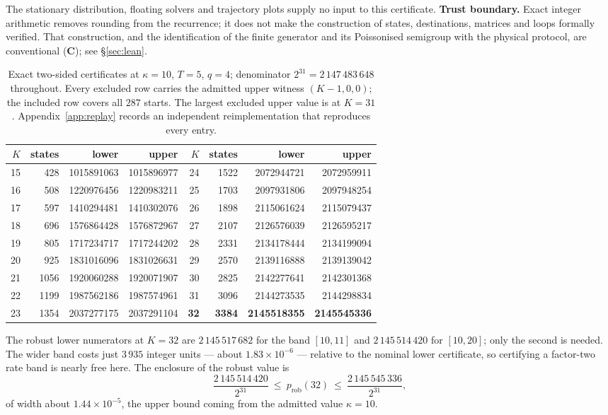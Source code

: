 \documentclass[11pt]{article}
\theoremstyle{plain}
\theoremstyle{definition}
\theoremstyle{remark}
\begin{document}
The stationary distribution, floating solvers and trajectory plots supply no
input to this certificate. \textbf{Trust boundary.} Exact integer arithmetic
removes rounding from the recurrence; it does not make the construction of
states, destinations, matrices and loops formally verified. That construction,
and the identification of the finite generator and its Poissonised semigroup
with the physical protocol, are conventional (\textbf{C}); see
\S\ref{sec:lean}.

\begin{table}[t]
\centering\small
\caption{Exact two-sided certificates at $\kappa=10$, $T=5$, $q=4$;
denominator $2^{31}=2\,147\,483\,648$ throughout. Every excluded row carries
the admitted upper witness $(K-1,0,0)$; the included row covers all $287$
starts. The largest excluded upper value is at $K=31$. Appendix~\ref{app:replay}
records an independent reimplementation that reproduces every entry.}
\label{tab:nominal}
\begin{tabular}{rrrr@{\qquad}rrrr}
\toprule
$K$ & states & lower & upper & $K$ & states & lower & upper\\
\midrule
15 & 428  & 1015891063 & 1015896977 & 24 & 1522 & 2072944721 & 2072959911\\
16 & 508  & 1220976456 & 1220983211 & 25 & 1703 & 2097931806 & 2097948254\\
17 & 597  & 1410294481 & 1410302076 & 26 & 1898 & 2115061624 & 2115079437\\
18 & 696  & 1576864428 & 1576872967 & 27 & 2107 & 2126576039 & 2126595217\\
19 & 805  & 1717234717 & 1717244202 & 28 & 2331 & 2134178444 & 2134199094\\
20 & 925  & 1831016096 & 1831026631 & 29 & 2570 & 2139116888 & 2139139042\\
21 & 1056 & 1920060288 & 1920071907 & 30 & 2825 & 2142277641 & 2142301368\\
22 & 1199 & 1987562186 & 1987574961 & 31 & 3096 & 2144273535 & 2144298834\\
23 & 1354 & 2037277175 & 2037291104 & \textbf{32} & \textbf{3384}
                                    & \textbf{2145518355} & \textbf{2145545336}\\
\bottomrule
\end{tabular}
\end{table}

The robust lower numerators at $K=32$ are $2\,145\,517\,682$ for the band
$[10,11]$ and $2\,145\,514\,420$ for $[10,20]$; only the second is needed. The
wider band costs just $3\,935$ integer units --- about
$1.83\times10^{-6}$ --- relative to the nominal lower certificate, so
certifying a factor-two rate band is nearly free here. The enclosure of the robust value is
\begin{equation}
\frac{2\,145\,514\,420}{2^{31}}\ \le\ p_{\mathrm{rob}}(32)\ \le\
\frac{2\,145\,545\,336}{2^{31}},
\end{equation}
of width about $1.44\times10^{-5}$, the upper bound coming from the admitted
value $\kappa=10$.
\end{document}
